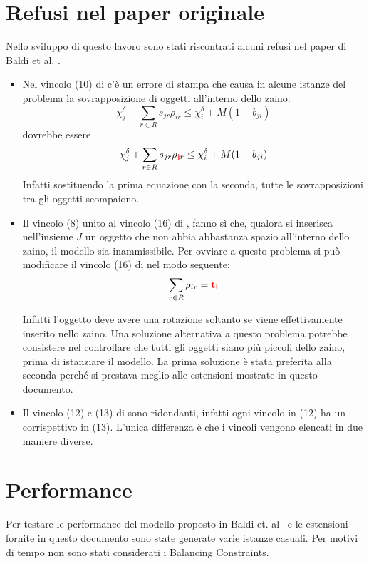 \documentclass{scrartcl}
\begin{document}
\section{Refusi nel paper originale}
Nello sviluppo di questo lavoro sono stati riscontrati alcuni refusi nel paper di Baldi et al. \cite{Baldi20129802}.
\begin{itemize}
	\item Nel vincolo (10) di \cite{Baldi20129802} c'è un errore di stampa che causa in alcune istanze del problema
	la sovrapposizione di oggetti all'interno dello zaino:
	$$
	\chi_j^\delta + \sum_{r\in R} s_{jr}\rho_{ir} \leq \chi_i^\delta + M(1-b_{ji})
	$$
	dovrebbe essere 
	$$
	\chi_j^\delta + \sum_{r\in R} s_{jr}\rho_{\mathbf{\color{red}j}r} \leq \chi_i^\delta + M(1-b_{ji})
	$$
	Infatti sostituendo la prima equazione con la seconda, tutte le sovrapposizioni tra gli oggetti scompaiono.
	
	\item Il vincolo (8) unito al vincolo (16) di \cite{Baldi20129802}, fanno sì che, qualora si inserisca nell'insieme $J$ un oggetto che non abbia abbastanza spazio all'interno dello zaino, il modello sia inammissibile. Per ovviare a questo problema si può modificare il vincolo (16) di \cite{Baldi20129802} nel modo seguente:
	$$
	\sum_{r \in R} \rho_{ir} = \color{red}\mathbf{t_i}
	$$
	
	
	Infatti l'oggetto deve avere una rotazione soltanto se viene effettivamente inserito nello zaino.
	Una soluzione alternativa a questo problema potrebbe consistere nel controllare che tutti gli oggetti siano più piccoli dello zaino, prima di istanziare il modello.
	La prima soluzione è stata preferita alla seconda perché si prestava meglio alle estensioni mostrate in questo documento.
	\item Il vincolo (12) e (13) di \cite{Baldi20129802} sono ridondanti, infatti ogni vincolo in (12) ha un corrispettivo in (13). L'unica differenza è che i vincoli vengono elencati in due maniere diverse. 
\end{itemize}


\section{Performance}
Per testare le performance del modello proposto in Baldi et. al~\cite{Baldi20129802} e le estensioni fornite
in questo documento sono state generate varie istanze casuali.
Per motivi di tempo non sono stati considerati i Balancing Constraints. 
\end{document}
